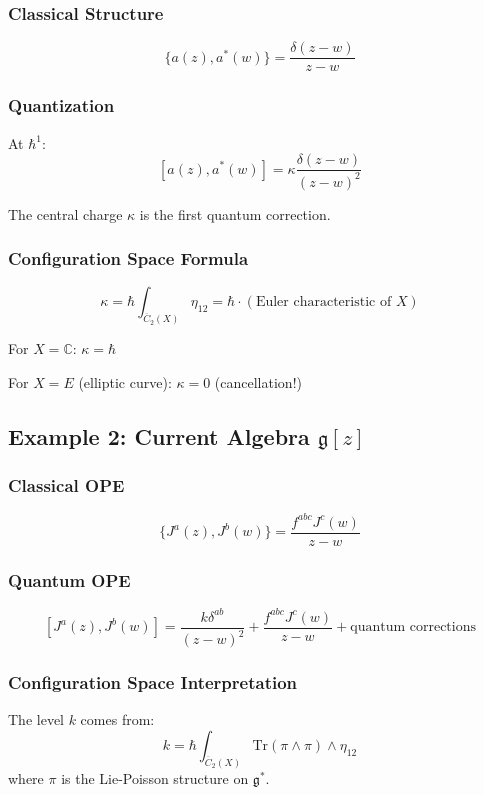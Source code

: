 \subsubsection{Classical Structure}

$$\{a(z), a^*(w)\} = \frac{\delta(z-w)}{z-w}$$

\subsubsection{Quantization}

At $\hbar^1$:
$$[a(z), a^*(w)] = \kappa \frac{\delta(z-w)}{(z-w)^2}$$

The central charge $\kappa$ is the first quantum correction.

\subsubsection{Configuration Space Formula}

$$\kappa = \hbar \int_{\overline{C}_2(X)} \eta_{12} = \hbar \cdot (\text{Euler characteristic of } X)$$

For $X = \mathbb{C}$: $\kappa = \hbar$

For $X = E$ (elliptic curve): $\kappa = 0$ (cancellation!)

\subsection{Example 2: Current Algebra $\mathfrak{g}[z]$}

\subsubsection{Classical OPE}

$$\{J^a(z), J^b(w)\} = \frac{f^{abc} J^c(w)}{z-w}$$

\subsubsection{Quantum OPE}

$$[J^a(z), J^b(w)] = \frac{k \delta^{ab}}{(z-w)^2} + \frac{f^{abc} J^c(w)}{z-w} + \text{quantum corrections}$$

\subsubsection{Configuration Space Interpretation}

The level $k$ comes from:
$$k = \hbar \int_{\overline{C}_2(X)} \text{Tr}(\pi \wedge \pi) \wedge \eta_{12}$$
where $\pi$ is the Lie-Poisson structure on $\mathfrak{g}^*$.

